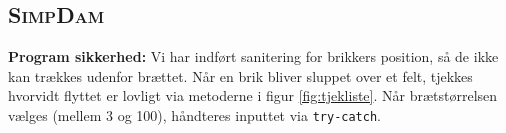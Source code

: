 \subsection{\textsc{SimpDam}}\label{sec:evaSimp}

\textbf{Program sikkerhed:} Vi har indført sanitering for brikkers position, så de ikke kan trækkes udenfor brættet. Når en brik bliver sluppet over et felt, tjekkes hvorvidt flyttet er lovligt via metoderne i figur \ref{fig:tjekliste}. Når brætstørrelsen vælges (mellem 3 og 100), håndteres inputtet via \texttt{try-catch}. 

